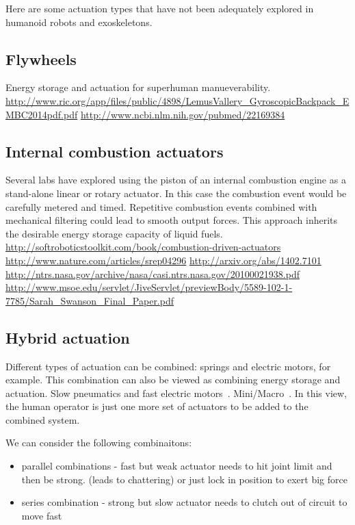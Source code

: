 \documentclass[letterpaper,12pt,fullpage]{article}
\begin{document}
Here are some actuation types that have not been adequately explored
in humanoid robots and exoskeletons.

\subsection{Flywheels}

Energy storage and actuation for superhuman manueverability.
\url{http://www.ric.org/app/files/public/4898/LemusVallery_GyroscopicBackpack_EMBC2014pdf.pdf}
\url{http://www.ncbi.nlm.nih.gov/pubmed/22169384}


\subsection{Internal combustion actuators}

Several labs have explored using the piston of an internal combustion
engine as a stand-alone linear or rotary actuator. In this case
the combustion event would be carefully metered and timed. Repetitive
combustion events combined with mechanical filtering could lead to smooth
output forces. This approach inherits the desirable energy storage capacity
of liquid fuels. 
\url{http://softroboticstoolkit.com/book/combustion-driven-actuators}
\url{http://www.nature.com/articles/srep04296}
\url{http://arxiv.org/abs/1402.7101}
\url{http://ntrs.nasa.gov/archive/nasa/casi.ntrs.nasa.gov/20100021938.pdf}
\url{http://www.msoe.edu/servlet/JiveServlet/previewBody/5589-102-1-7785/Sarah_Swanson_Final_Paper.pdf}

\subsection{Hybrid actuation}

Different types of actuation can be combined: springs and electric motors,
for example. This combination can also be viewed as combining energy
storage and actuation. Slow pneumatics and fast electric motors~\cite{Morimoto,UCLA}.
Mini/Macro~\cite{Stanford}. In this view, the human operator is just
one more set of actuators to be added to the combined system.

We can consider the following combinaitons:
\begin{itemize}
\item
parallel combinations - fast but weak  actuator needs to hit joint limit and then be strong. (leads to chattering) or just lock in position to exert big force
\item
series combination - strong but slow actuator needs to clutch out of circuit to move fast
\end{itemize}
\end{document}
